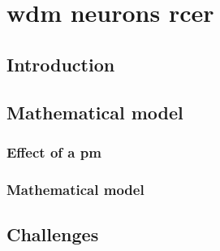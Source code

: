 \chapter{\acrlong{wdm} neurons \acrlong{rcer}}

\section{Introduction}

\section{Mathematical model}

\subsection{Effect of a \acrlong{pm}}

\subsection{Mathematical model}

\section{Challenges}